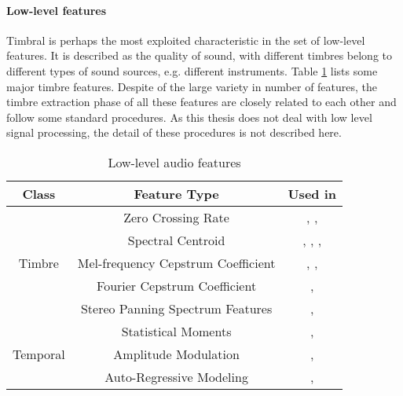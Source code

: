 \paragraph{Low-level features}

Timbral is perhaps the most exploited characteristic in the set of low-level features. It is described as the quality of sound, with different timbres belong to different types of sound sources, e.g. different instruments. Table \ref{table:2} lists some major timbre features. Despite of the large variety in number of features, the timbre extraction phase of all these features are closely related to each other and follow some standard procedures. As this thesis does not deal with low level signal processing, the detail of these procedures is not described here. 

\begin{table}[h!]
\centering
\begin{tabular}{| c | c | c |}
\hline
Class & Feature Type & Used in \\
\hline

\multirow{5}{*}{Timbre} & Zero Crossing Rate & \cite{tzanetakis2002musical}, \cite{li2003comparative}, \cite{bergstra2006aggregate} \\
& Spectral Centroid & \cite{tzanetakis2002musical}, \cite{li2003comparative}, \cite{bergstra2006aggregate}, \cite{morchen2006modeling} \\
& Mel-frequency Cepstrum Coefficient & \cite{tzanetakis2002musical}, \cite{bergstra2006aggregate}, \cite{mandel2006song} \\
& Fourier Cepstrum Coefficient & \cite{bergstra2006aggregate}, \cite{lin2005audio} \\
& Stereo Panning Spectrum Features & \cite{tzanetakis2007stereo}, \cite{tzanetakis2010stereo}\\

\hline

\multirow{3}{*}{Temporal} & Statistical Moments & \cite{tzanetakis2002musical}, \cite{li2003comparative} \\
& Amplitude Modulation & \cite{pampalk2002content}, \cite{pampalk2005improvements} \\
& Auto-Regressive Modeling & \cite{shawe2005investigation}, \cite{meng2007temporal} \\

\hline

\end{tabular}
\caption{Low-level audio features}
\label{table:2}
\end{table}


